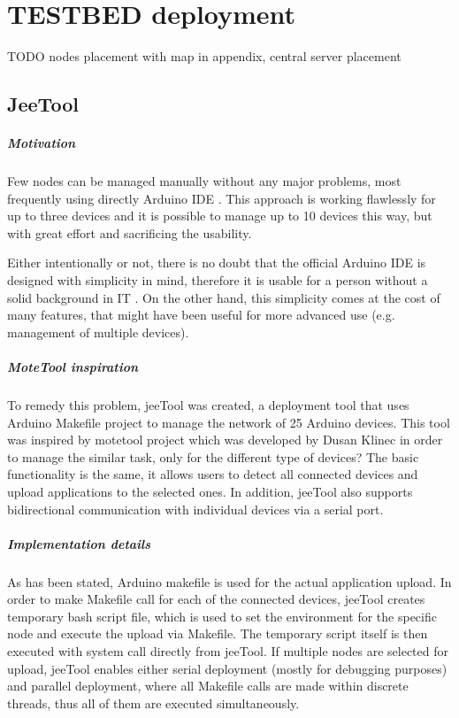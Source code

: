 \documentclass[
  print, %
  table,   %
  nolof,     %
  nolot,     %
           oneside
]{fithesis3}
\begin{document}
\chapter{TESTBED deployment}\label{ch:testbed}
TODO nodes placement with map in appendix, central server placement

  \section{JeeTool} %
\paragraph{Motivation}
  Few nodes can be managed manually without any major problems, most frequently using directly Arduino IDE \cite{Arduino}.
  This approach is working flawlessly for up to three devices and it is possible to manage up to 10 devices this way, but with great effort and sacrificing the usability.

  Either intentionally or not, there is no doubt that the official Arduino IDE is designed with simplicity in mind, therefore it is usable for a person without a solid background in IT \cite{ArduinoIntro}.
  On the other hand, this simplicity comes at the cost of many features, that might have been useful for more advanced use (e.g. management of multiple devices).

\paragraph{MoteTool inspiration}
  To remedy this problem, jeeTool \cite{JeeTool}
  was created, a deployment tool that uses Arduino Makefile project \cite{ArduinoMK}
  to manage the network of 25 Arduino devices. This tool was inspired by motetool project \cite{motetool}
  which was developed by Dusan Klinec in order to manage the similar task, only for the different type of devices? The basic functionality is the same, it allows users to detect all connected devices and upload applications to the selected ones. In addition, jeeTool also supports bidirectional communication with individual devices via a serial port.

\paragraph{Implementation details}
  As has been stated, Arduino makefile is used for the actual application upload. In order to make Makefile call for each of the connected devices, jeeTool creates temporary bash script file, which is used to set the environment for the specific node and execute the upload via Makefile. The temporary script itself is then executed with system call directly from jeeTool. If multiple nodes are selected for upload, jeeTool enables either serial deployment (mostly for debugging purposes) and parallel deployment, where all Makefile calls are made within discrete threads, thus all of them are executed simultaneously.
\end{document}
